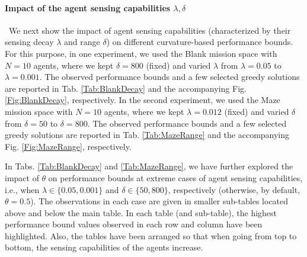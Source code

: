 \documentclass[letterpaper, 10 pt, conference]{ieeeconf}
\begin{document}
\paragraph{\textbf{Impact of the agent sensing capabilities} $\lambda, \delta$}\ 
We next show the impact of agent sensing capabilities (characterized by their sensing decay $\lambda$ and range $\delta$) on different curvature-based performance bounds. For this purpose, in one experiment, we used the Blank mission space with $N=10$ agents, where we kept $\delta = 800$ (fixed) and varied $\lambda$ from $\lambda = 0.05$ to $\lambda = 0.001$. The observed performance bounds and a few selected greedy solutions are reported in Tab. \ref{Tab:BlankDecay} and the accompanying Fig. \ref{Fig:BlankDecay}, respectively. In the second experiment, we used the Maze mission space with $N=10$ agents, where we kept $\lambda = 0.012$ (fixed) and varied $\delta$ from $\delta=50$ to $\delta = 800$. The observed performance bounds and a few selected greedy solutions are reported in Tab. \ref{Tab:MazeRange} and the accompanying Fig. \ref{Fig:MazeRange}, respectively.


In Tabs. \ref{Tab:BlankDecay} and \ref{Tab:MazeRange}, we have further explored the impact of $\theta$ on performance bounds at extreme cases of agent sensing capabilities, i.e., when $\lambda \in \{0.05,0.001\}$ and $\delta \in \{50,800\}$, respectively (otherwise, by default, $\theta=0.5$). The observations in each case are given in smaller sub-tables located above and below the main table. In each table (and sub-table), the highest performance bound values observed in each row and column have been highlighted. Also, the tables have been arranged so that when going from top to bottom, the sensing capabilities of the agents increase.  
\end{document}
